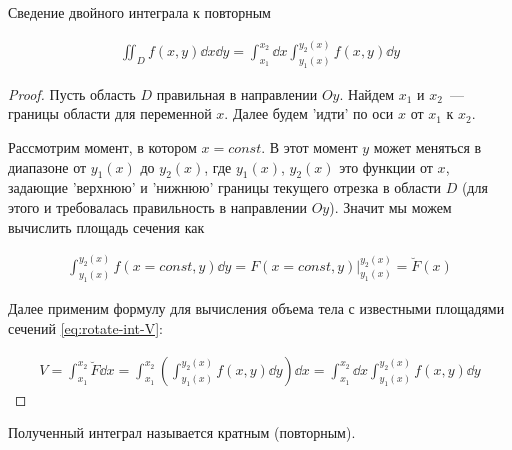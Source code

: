 
\begin{theorem}\label{iint-to-rep}
  Сведение двойного интеграла к повторным

  \begin{align*}
    \iint_{D} f(x, y) \dd x \dd y =
      \int_{x_{1}}^{x_{2}} \dd x \int_{y_{1}(x)}^{y_{2}(x)} f(x, y) \dd y
  \end{align*}
\end{theorem}
\begin{proof}
  Пусть область \(D\) правильная в направлении \(Oy\).
  Найдем \(x_{1}\) и \(x_{2}\)~--- границы области для переменной \(x\).
  Далее будем 'идти' по оси \(x\) от \(x_{1}\) к \(x_{2}\).

  Рассмотрим момент, в котором \(x = const\). В этот момент \(y\) может
  меняться в диапазоне от \(y_{1}(x)\) до \(y_{2}(x)\), где \(y_{1}(x)\),
  \(y_{2}(x)\) это функции от \(x\), задающие 'верхнюю' и 'нижнюю' границы
  текущего отрезка в области \(D\) (для этого и требовалась правильность в
  направлении \(Oy\)). Значит мы можем вычислить площадь сечения как
  
  \begin{align*}
    \int_{y_{1}(x)}^{y_{2}(x)} f(x = const, y) \dd y
    = F(x = const, y) \bigg\vert_{y_{1}(x)}^{y_{2}(x)}
    = \breve{F}(x)
  \end{align*}

  Далее применим формулу для вычисления объема тела с известными площадями
  сечений \eqref{eq:rotate-int-V}:

  \begin{align*}
    V
    = \int_{x_{1}}^{x_{2}} \breve{F} \dd x
    = \int_{x_{1}}^{x_{2}} \left(
      \int_{y_{1}(x)}^{y_{2}(x)} f(x, y) \dd y
    \right) \dd x
    = \int_{x_{1}}^{x_{2}} \dd x \int_{y_{1}(x)}^{y_{2}(x)} f(x, y) \dd y
  \end{align*}
\end{proof}

\begin{remark}
  Полученный интеграл называется кратным (повторным).
\end{remark}